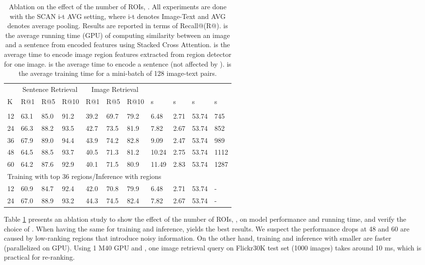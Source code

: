 \documentclass[runningheads]{llncs}
\begin{document}
\begin{table}[t!]
\begin{center}
\caption{Ablation on the effect of the number of ROIs, . All experiments are done with the SCAN i-t AVG setting, where i-t denotes Image-Text and AVG denotes average pooling. Results are reported in terms of Recall@(R@).  is the average running time (GPU) of computing similarity between an image and a sentence from encoded features using Stacked Cross Attention.  is the average time to encode image region features extracted from region detector for one image.  is the average time to encode a sentence (not affected by ).  is the average training time for a mini-batch of 128 image-text pairs. } 
\label{table:abk}
\begin{tabular}
{p{0.6cm}p{0.9cm}p{0.9cm}p{0.9cm}p{0.9cm}p{0.9cm}p{0.9cm}p{1.2cm}p{1.2cm}p{1.2cm}p{1.4cm}}
\hline\noalign{\smallskip}
 & \multicolumn{3}{c}{Sentence Retrieval} & \multicolumn{3}{c}{Image Retrieval} \\
K & R@1 & R@5 & R@10 & R@1 & R@5 & R@10 &  s &  s &  s &  s\\
\noalign{\smallskip}
\hline
\noalign{\smallskip}
\multicolumn{10}{l}{Training/Inference with top  regions} \\ 
12 & 63.1 & 85.0 & 91.2 & 39.2 & 69.7 & 79.2 & 6.48 & 2.71 & 53.74 & 745 \\ 
24 & 66.3 & 88.2 & 93.5 & 42.7 & 73.5 & 81.9 & 7.82 & 2.67 & 53.74 & 852 \\ 
36 & 67.9 & 89.0 & 94.4 & 43.9 & 74.2 & 82.8 & 9.09 & 2.47 & 53.74 & 989 \\ 
48 & 64.5 & 88.5 & 93.7 & 40.5 & 71.3 & 81.2 & 10.24 & 2.75 & 53.74 & 1112 \\ 
60 & 64.2 & 87.6 & 92.9 & 40.1 & 71.5 & 80.9 & 11.49 & 2.83 & 53.74 & 1287 \\ 
\hline
\multicolumn{10}{l}{Training with top 36 regions/Inference with  regions} \\ 
12 & 60.9 & 84.7 & 92.4 & 42.0 & 70.8 & 79.9 & 6.48 & 2.71 & 53.74 & - \\ 
24 & 67.0 & 88.9 & 93.2 & 44.3 & 74.5 & 82.4 & 7.82 & 2.67 & 53.74 & - \\ 
\hline
\end{tabular}
\end{center}
\end{table}
\setlength{\tabcolsep}{1.4pt}

Table \ref{table:abk} presents an ablation study to show the effect of the number of ROIs, , on model performance and running time, and verify the choice of . When having the same  for training and inference,  yields the best results. We suspect the performance drops at 48 and 60 are caused by low-ranking regions that introduce noisy information. On the other hand, training and inference with smaller  are faster (parallelized on GPU). Using 1 M40 GPU and , one image retrieval query on Flickr30K test set (1000 images) takes around 10 ms, which is practical for re-ranking.
\end{document}
